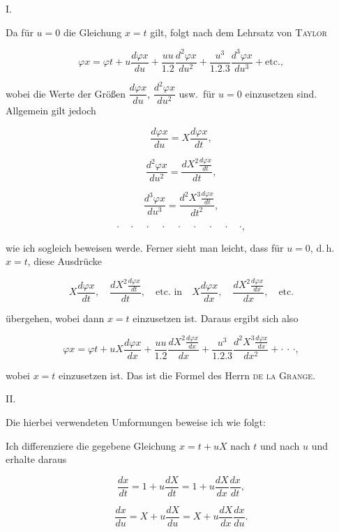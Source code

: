 
\begin{center}
I.
\end{center}

\noindent\hspace*{\parindent}Da für $u = 0$ die Gleichung $x = t$ gilt, folgt nach dem Lehrsatz von \textsc{Taylor}

\[
\varphi x = \varphi t + u \frac{d\varphi x}{du} + \frac{uu}{1.2}\frac{d^2\varphi x}{du^2}
+ \frac{u^3}{1.2.3}\frac{d^3\varphi x}{du^3} + \text{etc.},
\]

\noindent wobei die Werte der Größen $\dfrac{d\varphi x}{du}$, $\dfrac{d^2\varphi x}{du^2}$ usw.\ für
$u = 0$ einzusetzen sind. Allgemein gilt jedoch

\[
\frac{d\varphi x}{du} = X\frac{d\varphi x}{dt},
\]

\[
\frac{d^2\varphi x}{du^2} = \frac{dX^2 \frac{d\varphi x}{dt}}{dt},
\]

\[
\frac{d^3\varphi x}{du^3} = \frac{d^2X^3 \frac{d\varphi x}{dt}}{dt^2},
\]

\[
\cdot\quad\cdot\quad\cdot\quad\cdot\quad\cdot\quad\cdot\quad\cdot\quad\cdot\quad\cdot,
\]

\noindent wie ich sogleich beweisen werde. Ferner sieht man leicht, dass für $u = 0$, d.\,h.\
$x = t$, diese Ausdrücke

\[
X\frac{d\varphi x}{dt},\quad \frac{dX^2 \frac{d\varphi x}{dt}}{dt},\quad
\text{etc.\ in}\quad X\frac{d\varphi x}{dx},\quad \frac{dX^2 \frac{d\varphi x}{dx}}{dx},\quad \text{etc.}
\]

\noindent übergehen, wobei dann $x = t$ einzusetzen ist. Daraus ergibt sich also

\[
\varphi x = \varphi t + uX\frac{d\varphi x}{dx} + \frac{uu}{1.2}\frac{dX^2 \frac{d\varphi x}{dx}}{dx}
+ \frac{u^3}{1.2.3}\frac{d^2X^3 \frac{d\varphi x}{dx}}{dx^2} + \cdot\,\cdot\,\cdot,
\]

\noindent wobei $x = t$ einzusetzen ist. Das ist die Formel des Herrn \textsc{de la Grange}.

\medskip

\begin{center}
II.
\end{center}

\noindent\hspace*{\parindent}Die hierbei verwendeten Umformungen beweise ich wie folgt:

\noindent\hspace*{\parindent}Ich differenziere die gegebene Gleichung $x = t + uX$ nach $t$ und nach $u$
und erhalte daraus

\[
\frac{dx}{dt} = 1 + u\frac{dX}{dt} = 1 + u\frac{dX}{dx}\frac{dx}{dt},
\]

\[
\frac{dx}{du} = X + u\frac{dX}{du} = X + u\frac{dX}{dx}\frac{dx}{du}.
\]
